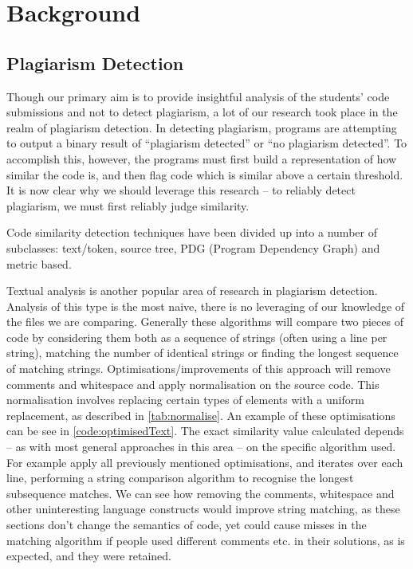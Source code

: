 \chapter{Background}

\label{Background}


\section{Plagiarism Detection}

Though our primary aim is to provide insightful analysis of the students' code 
submissions and not to detect plagiarism, a lot of our research took 
place in the realm of plagiarism detection. In detecting plagiarism, programs are attempting
to output a binary result of ``plagiarism detected'' or ``no plagiarism detected''.
To accomplish this, however, the programs must first build a representation of 
how similar the code is, and then flag code which is similar above a certain threshold.
It is now clear why we should leverage this research -- to reliably detect plagiarism,
we must first reliably judge similarity.

Code similarity detection techniques have been divided up into a number of subclasses:
text/token, source tree, PDG (Program Dependency Graph) and metric based\cite{CloneDetection}.

Textual analysis is another popular area of research in plagiarism
detection. Analysis of this type is the most naive, there is no leveraging
of our knowledge of the files we are comparing. Generally these algorithms
will compare two pieces of code by considering them both as a sequence of
strings (often using a line per string), matching the number of identical
strings or finding the longest sequence of matching strings. 
Optimisations/improvements of this approach will remove comments and whitespace
and apply normalisation on the source code. This normalisation involves replacing
certain types of elements with a uniform replacement, as described in 
\cref{tab:normalise}. An example of these optimisations can be see in 
\cref{code:optimisedText}. The exact similarity value calculated depends -- as
with most general approaches in this area -- on the specific algorithm used.
For example \cite{DucasseText} apply all previously mentioned optimisations,
and iterates over each line, performing a string comparison algorithm to recognise
the longest subsequence matches. We can see how removing the comments,
whitespace and other uninteresting language constructs would improve string
matching, as these sections don't change the semantics of code, yet could cause
misses in the matching algorithm if people used different comments etc. in
their solutions, as is expected, and they were retained.

